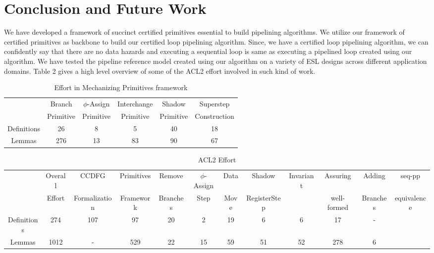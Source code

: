 \section{Conclusion and Future Work}
\label{sec:research-plan}

We have developed a framework of succinct certified primitives essential to build pipelining algorithms. We utilize our framework of certified primitives as backbone to build our certified loop pipelining algorithm. Since, we have a certified loop pipelining algorithm, we can confidently say that there are no data hazards and executing a sequential loop is same as executing a pipelined loop created using our algorithm. We have tested the pipeline reference model created using our algorithm on a variety of ESL designs across different application domains. Table 2 gives a high level overview of some of the ACL2 effort involved in such kind of work. %


\begin{table}
  \centering
  \label{fig:proof}
  \begin{tabular}{| c || c | c | c | c | c | }
    \hline
& Branch &  $\phi$-Assign   &     Interchange  &   Shadow &  Superstep   \\
& Primitive & Primitive & Primitive & Primitive & Construction \\
 \hline
 \hline                 
Definitions  & 26        &   8          &    5 & 40 & 18 \\
\hline
Lemmas    & 276       &     13         &    83  & 90 & 67 \\
\hline
  \end{tabular}
        \caption{Effort in Mechanizing Primitives framework}
\end{table}

\begin{table}
  \centering
  \label{fig:proof}
  \begin{tabular}{| c || c | c | c | c | c | c | c | c | c | c | c | }
    \hline
&   Overall & CCDFG &  Primitives &  Remove & $\phi$-Assign   &   Data &  Shadow &  Invariant & Assuring  & Adding  & seq-pp \\
                  
 &  Effort  &  Formalization &   Framework &   Branches & Step   &   Move     &    RegisterStep        &   &  well-formed  & Branches &  equivalence  \\
                  \hline
                  \hline
Definitions  & 274  &  107  &   97 &  20 &  2 &    19 &   6  &  6 & 17 & -  \\
\hline
Lemmas    & 1012   &  -  &   529   &  22 &   15 &   59 &   51 &  52 &  278 & 6  \\
\hline
  \end{tabular}
        \caption{ACL2 Effort}
\end{table}

